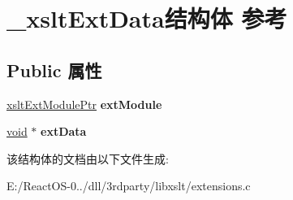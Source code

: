 \hypertarget{struct__xslt_ext_data}{}\section{\+\_\+xslt\+Ext\+Data结构体 参考}
\label{struct__xslt_ext_data}
\subsection*{Public 属性}
\begin{DoxyCompactItemize}
\item 
\mbox{\label{struct__xslt_ext_data_ade26f8c8b1f9b9655dd613fc9cc44967}} 
\hyperlink{struct__xslt_ext_module}{xslt\+Ext\+Module\+Ptr} {\bfseries ext\+Module}
\item 
\mbox{\label{struct__xslt_ext_data_a14eba581f2cc1e5fd0cba4104a067955}} 
\hyperlink{interfacevoid}{void} $\ast$ {\bfseries ext\+Data}
\end{DoxyCompactItemize}


该结构体的文档由以下文件生成\+:\begin{DoxyCompactItemize}
\item 
E\+:/\+React\+O\+S-\/0../dll/3rdparty/libxslt/extensions.\+c\end{DoxyCompactItemize}
